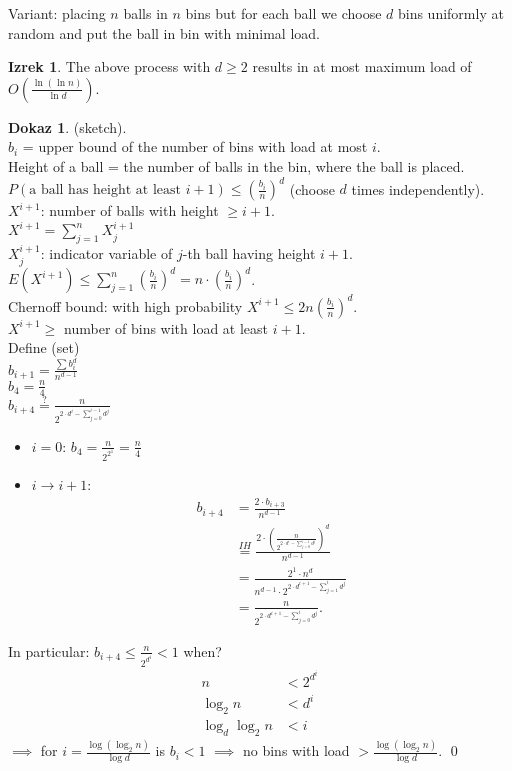 \documentclass[a4paper, 12pt]{book}
\theoremstyle{definition}
\newtheorem{theorem}[counter]{Izrek}
\newtheorem{pro}[counter]{Dokaz}
\theoremstyle{remark}
\begin{document}
Variant: placing $n$ balls in $n$ bins but for each ball we choose $d$ bins uniformly at random and
put the ball in bin with minimal load.
\begin{theorem}
  The above process with $d \geq 2$ results in at most maximum load of $O\left(\frac{\ln (\ln n)}{\ln d}\right)$.
\end{theorem}
\begin{pro}(sketch). \\
  $b_i$ = upper bound of the number of bins with load at most $i$. \\
  Height of a ball = the number of balls in the bin, where the ball is placed. \\
  $P(\text{a ball has height at least } i+1) \leq \left(\frac{b_i}{n}\right)^d$ (choose $d$ times independently). \\
  $X^{i+1}$: number of balls with height $ \geq i+1$. \\
  $X^{i+1} = \sum_{j=1}^{n} X_j^{i+1}$ \\
  $X_j^{i+1}$: indicator variable of $j$-th ball having height $i+1$. \\
  $E(X^{i+1}) \leq \sum_{j=1}^{n} \left(\frac{b_i}{n}\right)^d = n \cdot \left(\frac{b_i}{n}\right)^d$. \\
  Chernoff bound: with high probability $X^{i+1} \leq 2 n \left(\frac{b_i}{n}\right)^d$. \\
  $X^{i+1} \geq$ number of bins with load at least $i+1$. \\
  Define (set) \\
  $b_{i+1} = \frac{\sum b_i^d}{n^{d-1}}$ \\
  $b_4 = \frac{n}{4}$ \\
  $b_{i+4} \stackrel{?}{=} \frac{n}{2^{2 \cdot d^i - \sum_{j=0}^{i-1} d^j}}$
  \begin{itemize}[label={}]
    \item $i=0$: $b_4 = \frac{n}{2^{2^1}} = \frac{n}{4}$
    \item $i \to i+1$:
      \begin{align*}
        b_{i+4} &= \frac{2 \cdot b_{i+3}}{n^{d-1}} \\
        &\stackrel{IH}{=} \frac{2 \cdot \left(\frac{n}{2^{2 \cdot d^i - \sum_{j=0}^{i-1} d^j}}\right)^d}{n^{d-1}} \\
        &= \frac{2^1 \cdot n^d}{n^{d-1} \cdot 2^{2 \cdot d^{i+1} - \sum_{j=1}^{i} d^j}} \\
        &= \frac{n}{2^{2 \cdot d^{i+1} - \sum_{j=0}^{i} d^j}}.
      \end{align*}
  \end{itemize}
  In particular: $b_{i+4} \leq \frac{n}{2^{d^i}} < 1$ when?
  \begin{align*}
    n &< 2^{d^i} \\
    \log_2 n &< d^i \\
    \log_d \log_2 n &< i
  \end{align*}
  $\implies$ for $i = \frac{\log (\log_2 n)}{\log d}$ is $b_i < 1$ $\implies$ no bins with load
  $> \frac{\log (\log_2 n)}{\log d}$.
  \qed
\end{pro}
\end{document}
